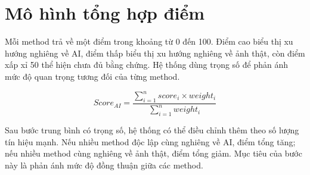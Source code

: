 \section{Mô hình tổng hợp điểm}
Mỗi method trả về một điểm trong khoảng từ 0 đến 100. Điểm cao biểu thị xu hướng nghiêng về AI, điểm thấp biểu thị xu hướng nghiêng về ảnh thật, còn điểm xấp xỉ 50 thể hiện chưa đủ bằng chứng. Hệ thống dùng trọng số để phản ánh mức độ quan trọng tương đối của từng method.

\[
Score_{AI}=\frac{\sum_{i=1}^{n} score_i \times weight_i}{\sum_{i=1}^{n} weight_i}
\]

Sau bước trung bình có trọng số, hệ thống có thể điều chỉnh thêm theo số lượng tín hiệu mạnh. Nếu nhiều method độc lập cùng nghiêng về AI, điểm tổng tăng; nếu nhiều method cùng nghiêng về ảnh thật, điểm tổng giảm. Mục tiêu của bước này là phản ánh mức độ đồng thuận giữa các method.
